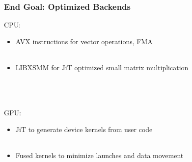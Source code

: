 \documentclass{beamer}
\begin{document}
\begin{frame}
\begin{center}
\frametitle{End Goal: Optimized Backends}

CPU:\\

\begin{itemize}

\item AVX instructions for vector operations, FMA\\

~\\

\item LIBXSMM for JiT optimized small matrix multiplication\\

\end{itemize}\\

~\\

~\\

GPU:\\

\begin{itemize}

\item JiT to generate device kernels from user code\\

~\\

\item Fused kernels to minimize launches and data movement\\

\end{itemize}

\end{center}
\end{frame}

\end{document}
